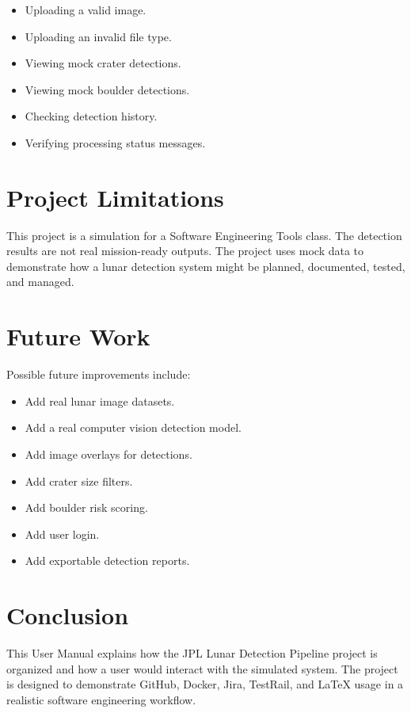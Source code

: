 \documentclass[12pt]{article}
\begin{document}
\begin{itemize}
    \item Uploading a valid image.
    \item Uploading an invalid file type.
    \item Viewing mock crater detections.
    \item Viewing mock boulder detections.
    \item Checking detection history.
    \item Verifying processing status messages.
\end{itemize}

\section{Project Limitations}

This project is a simulation for a Software Engineering Tools class. The detection results are not real mission-ready outputs. The project uses mock data to demonstrate how a lunar detection system might be planned, documented, tested, and managed.

\section{Future Work}

Possible future improvements include:

\begin{itemize}
    \item Add real lunar image datasets.
    \item Add a real computer vision detection model.
    \item Add image overlays for detections.
    \item Add crater size filters.
    \item Add boulder risk scoring.
    \item Add user login.
    \item Add exportable detection reports.
\end{itemize}

\section{Conclusion}

This User Manual explains how the JPL Lunar Detection Pipeline project is organized and how a user would interact with the simulated system. The project is designed to demonstrate GitHub, Docker, Jira, TestRail, and LaTeX usage in a realistic software engineering workflow.
\end{document}

